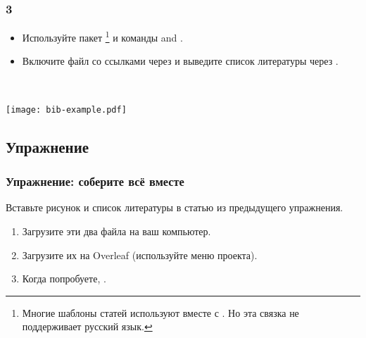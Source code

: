 \documentclass{beamer}
\begin{document}
\begin{frame}[fragile]
\frametitle{\insertsubsection{} 3}
\vspace{-3ex}
\small
\begin{itemize}
\item Используйте пакет \footnote{\scriptsize Многие шаблоны статей используют
 вместе с . Но эта связка не поддерживает русский язык.}
и команды  and .
\item Включите файл со ссылками через  и выведите список
литературы через .
\end{itemize}
\vspace{-2ex}
\begin{minipage}{0.55\linewidth}
\end{minipage}~~%
\begin{minipage}{0.45\linewidth}
\texttt{[image: bib-example.pdf]}
\end{minipage}
\end{frame}

\subsection{Упражнение}

\begin{frame}[fragile]
\frametitle{Упражнение: соберите всё вместе}
Вставьте рисунок и список литературы в статью из предыдущего упражнения.
\begin{enumerate}
\item Загрузите эти два файла на ваш компьютер.
\vspace{1ex}
\begin{center}

\end{center}
\vspace{1ex}
\item Загрузите их на Overleaf (используйте меню проекта).
\item Когда попробуете,
.
\end{enumerate}
\end{frame}
\end{document}
